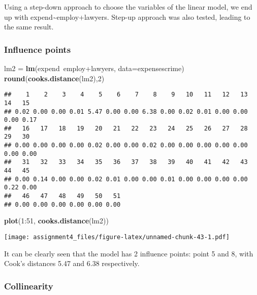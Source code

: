 \documentclass[11pt,]{article}
\newenvironment{Shaded}{\begin{snugshade}}{\end{snugshade}}
\newcommand{\KeywordTok}[1]{\textcolor[rgb]{0.13,0.29,0.53}{\textbf{{#1}}}}
\newcommand{\DataTypeTok}[1]{\textcolor[rgb]{0.13,0.29,0.53}{{#1}}}
\newcommand{\DecValTok}[1]{\textcolor[rgb]{0.00,0.00,0.81}{{#1}}}
\newcommand{\StringTok}[1]{\textcolor[rgb]{0.31,0.60,0.02}{{#1}}}
\newcommand{\NormalTok}[1]{{#1}}
\begin{document}
Using a step-down approach to choose the variables of the linear model,
we end up with expend\textasciitilde{}employ+lawyers. Step-up approach
was also tested, leading to the same result.

\subsubsection{Influence points}\label{influence-points}

\begin{Shaded}
\begin{Highlighting}[]
\NormalTok{lm2 =}\StringTok{ }\KeywordTok{lm}\NormalTok{(expend~employ+lawyers, }\DataTypeTok{data=}\NormalTok{expensescrime)}
\KeywordTok{round}\NormalTok{(}\KeywordTok{cooks.distance}\NormalTok{(lm2),}\DecValTok{2}\NormalTok{)}
\end{Highlighting}
\end{Shaded}

\begin{verbatim}
##    1    2    3    4    5    6    7    8    9   10   11   12   13   14   15 
## 0.02 0.00 0.00 0.01 5.47 0.00 0.00 6.38 0.00 0.02 0.01 0.00 0.00 0.00 0.17 
##   16   17   18   19   20   21   22   23   24   25   26   27   28   29   30 
## 0.00 0.00 0.00 0.00 0.02 0.00 0.00 0.02 0.00 0.00 0.00 0.00 0.00 0.00 0.00 
##   31   32   33   34   35   36   37   38   39   40   41   42   43   44   45 
## 0.00 0.14 0.00 0.00 0.02 0.01 0.00 0.00 0.01 0.00 0.00 0.00 0.00 0.22 0.00 
##   46   47   48   49   50   51 
## 0.00 0.00 0.00 0.00 0.00 0.00
\end{verbatim}

\begin{Shaded}
\begin{Highlighting}[]
\KeywordTok{plot}\NormalTok{(}\DecValTok{1}\NormalTok{:}\DecValTok{51}\NormalTok{, }\KeywordTok{cooks.distance}\NormalTok{(lm2))}
\end{Highlighting}
\end{Shaded}

\texttt{[image: assignment4\_files/figure-latex/unnamed-chunk-43-1.pdf]}

It can be clearly seen that the model has 2 influence points: point 5
and 8, with Cook's distances 5.47 and 6.38 respectively.

\subsubsection{Collinearity}\label{collinearity}
\end{document}

